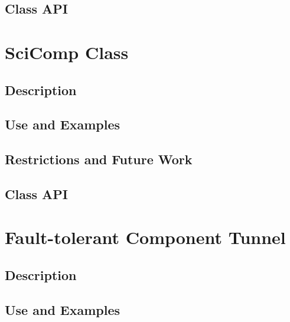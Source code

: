 \documentclass[english]{article}
\begin{document}
\subsection{Class API}

\section{SciComp Class}
\subsection{Description}

%
%
\subsection{Use and Examples}


\subsection{Restrictions and Future Work}

\subsection{Class API}

\section{Fault-tolerant Component Tunnel}
\subsection{Description}

\subsection{Use and Examples}


\end{document}
